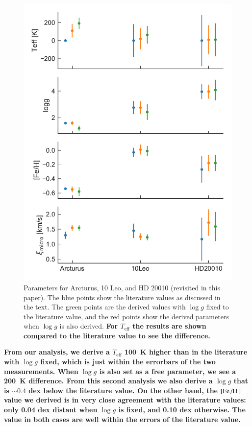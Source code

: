 \documentclass{aa}
\begin{document}
\begin{figure}[htpb!]
    \centering
    \includegraphics[width=1.0\linewidth]{figures/parameters.pdf}
    \caption{Parameters for Arcturus, 10 Leo, and HD 20010 (revisited in this paper). The blue
             points show the literature values as discussed in the text. The green points are the
             derived values with $\log g$ fixed to the literature value, and the red points show the
             derived parameters when $\log g$ is also derived. {\bf For $T_\mathrm{eff}$ the results
             are shown compared to the literature value to see the difference.}}
    \label{fig:parameters}
\end{figure}

{\bf From our analysis, we derive a $T_\mathrm{eff}$ \SI{100}{K} higher than in the literature with
$\log g$ fixed, which is just within the errorbars of the two measurements. When $\log g$ is also
set as a free parameter, we see a \SI{200}{K} difference.  From this second analysis we also derive
a $\log g$ that is $\sim 0.4$ dex below the literature value. On the other hand, the
$[\ion{Fe}/\ion{H}]$ value we derived is in very close agreement with the literature values: only
0.04 dex distant when $\log g$ is fixed, and 0.10 dex otherwise. The value in both cases are well
within the errors of the literature value.}
\end{document}
